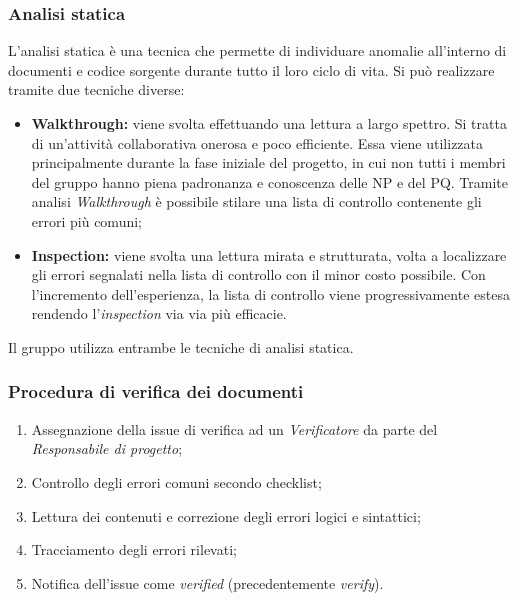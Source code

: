 \documentclass[../NormediProgetto.tex]{subfiles}
\begin{document}
\subsubsection{Analisi statica}

L’analisi statica è una tecnica che permette di individuare anomalie all’interno di documenti e codice sorgente durante tutto il loro ciclo di vita. Si può realizzare tramite due tecniche diverse:

\begin{itemize}
    \item \textbf{Walkthrough:} viene svolta effettuando una lettura a largo spettro. Si tratta di un’attività collaborativa onerosa e poco efficiente. Essa viene utilizzata principalmente durante la fase iniziale del progetto, in cui non tutti i membri del gruppo hanno piena padronanza e conoscenza delle NP e del PQ. Tramite analisi \textit{Walkthrough} è possibile stilare una lista di controllo contenente gli errori più comuni;
    
    \item \textbf{Inspection:} viene svolta una lettura mirata e strutturata, volta a localizzare gli errori segnalati nella lista di controllo con il minor costo possibile. Con l'incremento dell'esperienza, la lista di controllo viene progressivamente estesa rendendo l’\textit{inspection} via via più efficacie.
\end{itemize}

Il gruppo utilizza entrambe le tecniche di analisi statica.

\subsubsection{Procedura di verifica dei documenti}

\begin{enumerate}
    \item Assegnazione della issue di verifica ad un \textit{Verificatore} da parte del \textit{Responsabile di progetto};
    
    \item Controllo degli errori comuni secondo checklist;
    
    \item Lettura dei contenuti e correzione degli errori logici e sintattici;
    
    \item Tracciamento degli errori rilevati;
    
    \item Notifica dell'issue come \textit{verified} (precedentemente \textit{verify}).
\end{enumerate}
\end{document}
